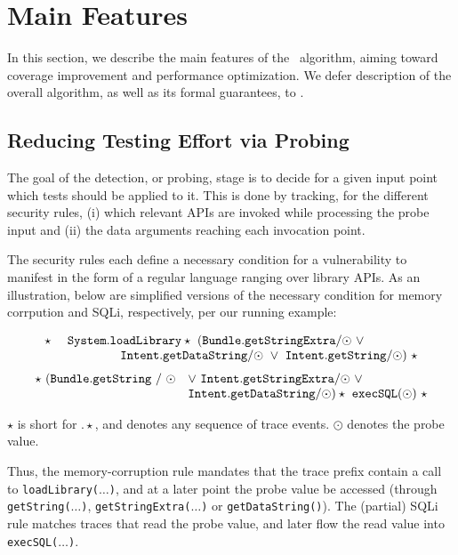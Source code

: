 \section{Main Features}\label{Se:corealg}

In this section, we describe the main features of the \Tool\ algorithm, aiming toward coverage improvement and performance optimization. We defer description of the overall algorithm, as well as its formal guarantees, to .

\subsection{Reducing Testing Effort via Probing}\label{Se:detectionSubsec}

The goal of the detection, or probing, stage is to decide for a given input point which tests should be applied to it. This is done by tracking, for the different security rules, (i) which relevant APIs are invoked while processing the probe input and (ii) the data arguments reaching each invocation point. 

The security rules each define a necessary condition for a vulnerability to manifest in the form of a regular language ranging over library APIs. As an illustration, below are simplified versions of the necessary condition for memory corrpution and SQLi, respectively, per our running example:

\begin{scriptsize}
$$
\begin{array}{rl}
	\star\ & {\tt System.loadLibrary}  
	\star\ ({\tt Bundle.getStringExtra / \odot}\ \vee \\ & \hspace{1.5cm} {\tt Intent.getDataString / \odot}\  
	\vee\ {\tt Intent.getString / \odot})\ \star
\end{array}
$$
$$
\begin{array}{rl}
	\star\ ({\tt Bundle.getString\ /\ \odot} & \vee\ {\tt Intent.getStringExtra / \odot}\ \vee \\ 
	& {\tt Intent.getDataString / \odot}) \star\ {\tt execSQL(\odot)}\ \star
\end{array}
$$
\end{scriptsize}
$\star$ is short for $. \star$, and denotes any sequence of trace events. $\odot$ denotes the probe value. 

Thus, the memory-corruption rule mandates that the trace prefix contain a call to {\tt loadLibrary($\ldots$)}, and at a later point the probe value be accessed (through {\tt getString($\ldots$)}, {\tt getStringExtra($\ldots$)} or {\tt getDataString()}). The (partial) SQLi rule matches traces that read the probe value, and later flow the read value into {\tt execSQL($\ldots$)}.

